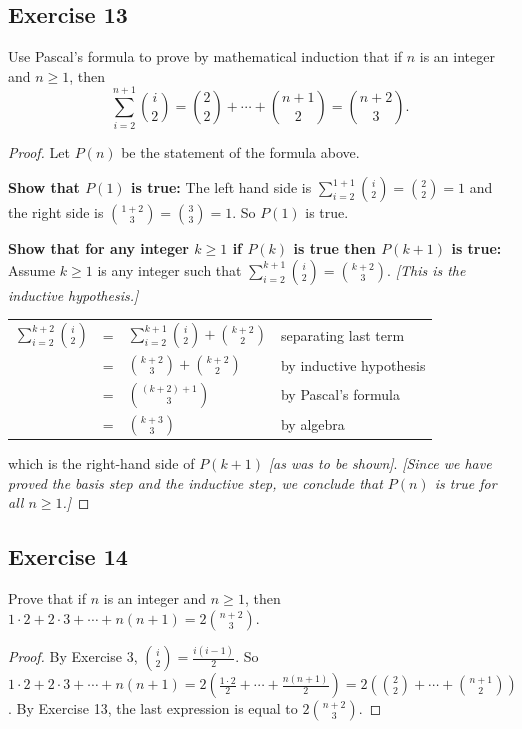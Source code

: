 \documentclass[14pt]{extarticle}
\newcommand{\dps}{\displaystyle}
\newcommand{\cy}{\color{cyan}}
\begin{document}
\subsection{Exercise 13}
Use Pascal’s formula to prove by mathematical induction that if \(n\) is an integer and \(n \geq 1\), then
\[
\sum_{i=2}^{n+1}\binom{i}{2} = \binom{2}{2} + \cdots + \binom{n+1}{2} = \binom{n+2}{3}.
\]
\begin{proof}
Let \(P(n)\) be the statement of the formula above.

{\bf Show that \(P(1)\) is true:} The left hand side is \(\sum_{i=2}^{1+1}\binom{i}{2} = \binom{2}{2} = 1\) and the 
right side is \(\binom{1+2}{3} = \binom{3}{3} = 1\). So \(P(1)\) is true.

{\bf Show that for any integer \(k \geq 1\) if \(P(k)\) is true then \(P(k+1)\) is true:} Assume \(k \geq 1\) is any
integer such that \(\sum_{i=2}^{k+1} \binom{i}{2} = \binom{k+2}{3}\). {\it [This is the inductive hypothesis.]}
\begin{center}
\begin{tabular}{rcll}
\(\dps \sum_{i=2}^{k+2} \binom{i}{2}\) & = & \(\dps \sum_{i=2}^{k+1} \binom{i}{2} + \binom{k+2}{2}\) & {\cy separating last 
term} \\
& = & \(\dps \binom{k+2}{3} + \binom{k+2}{2}\) & {\cy by inductive hypothesis} \\
& = & \(\dps \binom{(k+2)+1}{3}\) & {\cy by Pascal's formula} \\
& = & \(\dps \binom{k+3}{3}\) & {\cy by algebra}
\end{tabular}
\end{center}
which is the right-hand side of \(P(k + 1)\) {\it [as was to be shown]}. {\it [Since we have proved the basis step and the 
inductive step, we conclude that \(P(n)\) is true for all \(n \geq 1\).]}
\end{proof}

\subsection{Exercise 14}
Prove that if \(n\) is an integer and \(n \geq 1\), then \(1 \cdot 2 + 2 \cdot 3 + \cdots + n(n + 1) = 2 \binom{n+2}{3}\).

\begin{proof}
By Exercise 3, \(\binom{i}{2} = \frac{i(i-1)}{2}\). 
So \(1 \cdot 2 + 2 \cdot 3 + \cdots + n(n + 1) = 2 \left( \frac{1 \cdot 2}{2} + \cdots + \frac{n(n+1)}{2}\right) = 
2\left(\binom{2}{2} + \cdots + \binom{n+1}{2}\right)\).
By Exercise 13, the last expression is equal to \(2 \binom{n+2}{3}\).
\end{proof}
\end{document}
